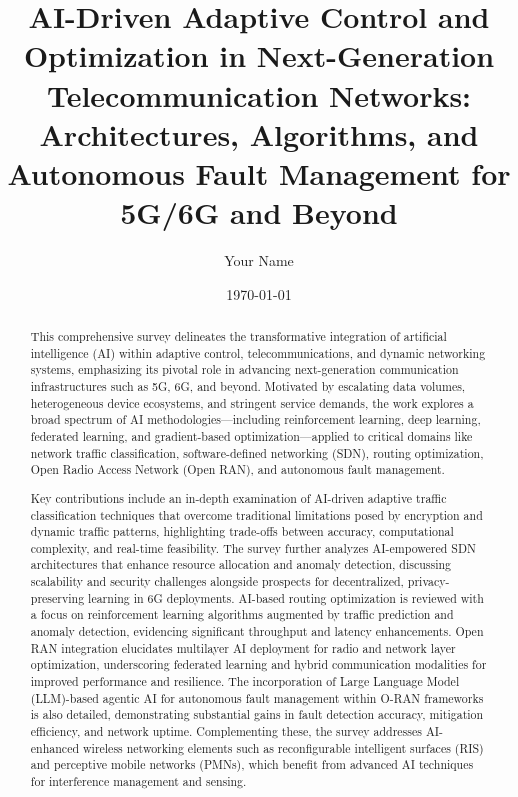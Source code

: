 \documentclass[11pt]{article}
\begin{document}
\author{Your Name}
\date{\today}

\title{\title{AI-Driven Adaptive Control and Optimization in Next-Generation Telecommunication Networks: Architectures, Algorithms, and Autonomous Fault Management for 5G/6G and Beyond}}
\maketitle

\begin{abstract}
This comprehensive survey delineates the transformative integration of artificial intelligence (AI) within adaptive control, telecommunications, and dynamic networking systems, emphasizing its pivotal role in advancing next-generation communication infrastructures such as 5G, 6G, and beyond. Motivated by escalating data volumes, heterogeneous device ecosystems, and stringent service demands, the work explores a broad spectrum of AI methodologies—including reinforcement learning, deep learning, federated learning, and gradient-based optimization—applied to critical domains like network traffic classification, software-defined networking (SDN), routing optimization, Open Radio Access Network (Open RAN), and autonomous fault management.

Key contributions include an in-depth examination of AI-driven adaptive traffic classification techniques that overcome traditional limitations posed by encryption and dynamic traffic patterns, highlighting trade-offs between accuracy, computational complexity, and real-time feasibility. The survey further analyzes AI-empowered SDN architectures that enhance resource allocation and anomaly detection, discussing scalability and security challenges alongside prospects for decentralized, privacy-preserving learning in 6G deployments. AI-based routing optimization is reviewed with a focus on reinforcement learning algorithms augmented by traffic prediction and anomaly detection, evidencing significant throughput and latency enhancements. Open RAN integration elucidates multilayer AI deployment for radio and network layer optimization, underscoring federated learning and hybrid communication modalities for improved performance and resilience. The incorporation of Large Language Model (LLM)-based agentic AI for autonomous fault management within O-RAN frameworks is also detailed, demonstrating substantial gains in fault detection accuracy, mitigation efficiency, and network uptime. Complementing these, the survey addresses AI-enhanced wireless networking elements such as reconfigurable intelligent surfaces (RIS) and perceptive mobile networks (PMNs), which benefit from advanced AI techniques for interference management and sensing.


\end{abstract}
\end{document}
